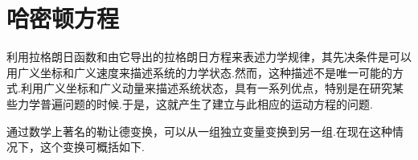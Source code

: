 \section{哈密顿方程\protect\footnotemark}

利用拉格朗日函数和由它导出的拉格朗日方程来表述力学规律，其先决条件是可以用广义坐标和广义速度来描述系统的力学状态.然而，这种描述不是唯一可能的方式.利用广义坐标和广义动量来描述系统状态，具有一系列优点，特别是在研究某些力学普遍问题的时候.于是，这就产生了建立与此相应的运动方程的问题.

通过数学上著名的勒让德变换，可以从一组独立变量变换到另一组.在现在这种情况下，这个变换可概括如下.


